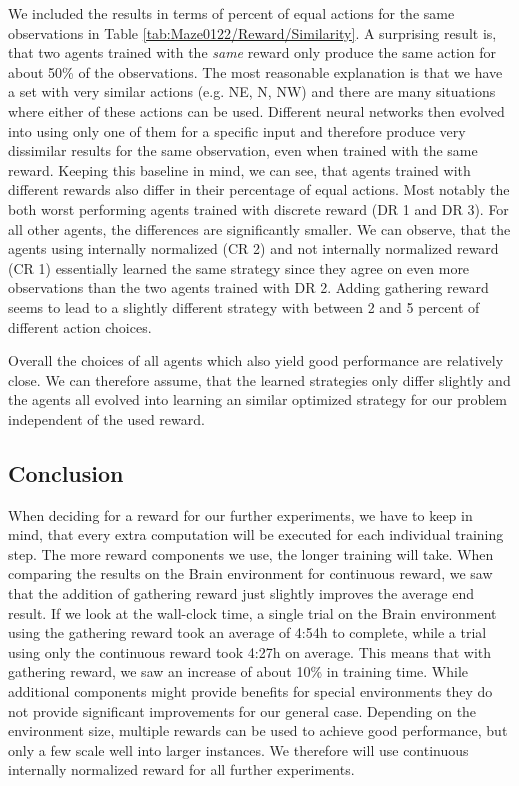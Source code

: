 We included the results in terms of percent of equal actions for the same observations in Table \ref{tab:Maze0122/Reward/Similarity}. A surprising result is, that two agents trained with the \textit{same} reward only produce the same action for about 50\% of the observations. The most reasonable explanation is that we have a set with very similar actions (e.g. NE, N, NW) and there are many situations where either of these actions can be used. Different neural networks then evolved into using only one of them for a specific input and therefore produce very dissimilar results for the same observation, even when trained with the same reward. Keeping this baseline in mind, we can see, that agents trained with different rewards also differ in their percentage of equal actions. Most notably the both worst performing agents trained with discrete reward (DR 1 and DR 3). For all other agents, the differences are significantly smaller. We can observe, that the agents using internally normalized (CR 2) and not internally normalized reward (CR 1) essentially learned the same strategy since they agree on even more observations than the two agents trained with DR 2. Adding gathering reward seems to lead to a slightly different strategy with between 2 and 5 percent of different action choices. 

Overall the choices of all agents which also yield good performance are relatively close. We can therefore assume, that the learned strategies only differ slightly and the agents all evolved into learning an similar optimized strategy for our problem independent of the used reward. 

\subsection{Conclusion} \label{sec:RewardConclusion}
When deciding for a reward for our further experiments, we have to keep in mind, that every extra computation will be executed for each individual training step. The more reward components we use, the longer training will take. When comparing the results on the Brain environment for continuous reward, we saw that the addition of gathering reward just slightly improves the average end result. If we look at the wall-clock time, a single trial on the Brain environment using the gathering reward took an average of 4:54h to complete, while a trial using only the continuous reward took 4:27h on average. This means that with gathering reward, we saw an increase of about 10\% in training time. While additional components might provide benefits for special environments they do not provide significant improvements for our general case. Depending on the environment size, multiple rewards can be used to achieve good performance, but only a few scale well into larger instances. We therefore will use continuous internally normalized reward for all further experiments.

